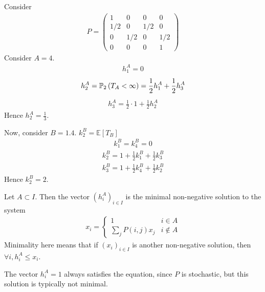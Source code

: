 \begin{example}
	Consider
	\begin{align*}
		P = \begin{pmatrix}
			1   & 0   & 0   & 0   \\
			1/2 & 0   & 1/2 & 0   \\
			0   & 1/2 & 0   & 1/2 \\
			0   & 0   & 0   & 1
		\end{pmatrix}
	\end{align*}
	Consider $A = \qty{4}$.
	\begin{align*}
		h_1^A = 0
	\end{align*}
	\begin{align*}
		h_2^A = \mathbb{P}_{2}\left({T_A < \infty}\right) = \frac{1}{2} h_1^A + \frac{1}{2} h_3^A
	\end{align*}
	\begin{align*}
		h_3^A = \frac{1}{2} \cdot 1 + \frac{1}{2} h_2^A
	\end{align*}
	Hence $h_2^A = \frac{1}{3}$.

	Now, consider $B = \qty{1,4}$.
	$k_2^B = \mathbb{E}[T_B]$
	\begin{align*}
		k_1^B = k_4^B = 0
	\end{align*}
	\begin{align*}
		k_2^B = 1 + \frac{1}{2} k_1^B + \frac{1}{2} k_3^B
	\end{align*}
	\begin{align*}
		k_3^B = 1 + \frac{1}{2} k_4^B + \frac{1}{2} k_2^B
	\end{align*}
	Hence $k_2^B = 2$.
\end{example}
\begin{theorem}
	Let $A \subset I$.
	Then the vector $(h_i^A)_{i \in I}$ is the minimal non-negative solution to the system
	\begin{align*}
		x_i = \begin{cases}
			1 & i \in A     \\
			\sum_j P(i,j) x_j & i \not\in A\end{cases}
	\end{align*}
	Minimality here means that if $(x_i)_{i \in I}$ is another non-negative solution, then $\forall i, h_i^A \leq x_i$.
\end{theorem}
\begin{note}
	The vector $h_i^A = 1$ always satisfies the equation, since $P$ is stochastic, but this solution is typically not minimal.
\end{note}
